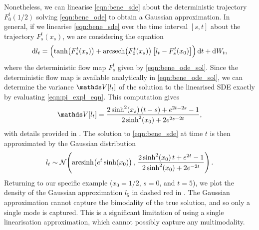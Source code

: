 Nonetheless, we can linearise \cref{eqn:bene_sde} about the deterministic trajectory \(F_0^t\!\left(1/2\right)\) solving \cref{eqn:bene_ode} to obtain a Gaussian approximation.
In general, if we linearise \cref{eqn:bene_sde} over the time interval \([s,t]\) about the trajectory \(F_s^t\!\left(x_s\right)\), we are considering the equation
\[
	\dif l_t = \left(\tanh\!\left(F_s^t\!\left(x_s\right)\right) + \arcsech\!\left(F_0^t\!\left(x_s\right)\right)\left[l_t - F_s^t\!\left(x_0\right)\right]\right)\dif t + \dif W_t,
\]
where the deterministic flow map \(F_s^t\) given by \cref{eqn:bene_ode_sol}.
Since the deterministic flow map is available analytically in \cref{eqn:bene_ode_sol}, we can determine the variance \(\var{l_t}\) of the solution to the linearised SDE exactly by evaluating \cref{eqn:pi_expl_eqn}.
This computation gives
\[
	\var{l_t} = \frac{2\sinh^2\!\left(x_s\right)\left(t - s\right) + e^{2t - 2s} - 1}{2\sinh^2\!\left(x_0\right) + 2e^{2s - 2t}},
\]
with details provided in .
The solution to \cref{eqn:bene_sde} at time \(t\) is then approximated by the Gaussian distribution
\[
	l_t \sim \mathcal{N}\!\left(\operatorname{arcsinh}\!\left(e^t \sinh\!\left(x_0\right)\right),\, \frac{2\sinh^2\!\left(x_0\right)t + e^{2t} - 1}{2\sinh^2\!\left(x_0\right) + 2e^{-2t}}\right).
\]
Returning to our specific example (\(x_0 = 1/2\), \(s = 0\), and \(t = 5\)), we plot the density of the Gaussian approximation \(l_5\) in dashed red in .
The Gaussian approximation cannot capture the bimodality of the true solution, and so only a single mode is captured.
This is a significant limitation of using a single linearisation approximation, which cannot possibly capture any multimodality.




